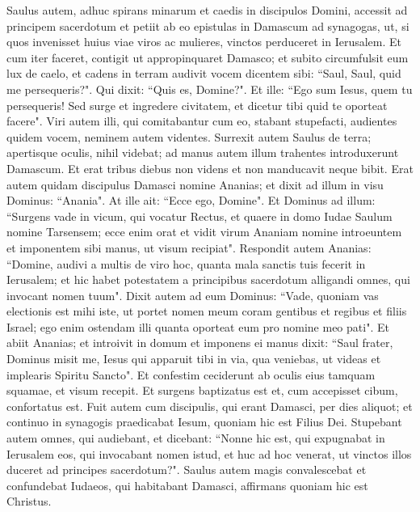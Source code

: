 \begin{biblechapter}  
\verse Saulus autem, adhuc spirans minarum et caedis in discipulos Domini, accessit ad principem sacerdotum 
\verse et petiit ab eo epistulas in Damascum ad synagogas, ut, si quos invenisset huius viae viros ac mulieres, vinctos perduceret in Ierusalem. 
\verse Et cum iter faceret, contigit ut appropinquaret Damasco; et subito circumfulsit eum lux de caelo, 
\verse et cadens in terram audivit vocem dicentem sibi: “Saul, Saul, quid me persequeris?". 
\verse Qui dixit: “Quis es, Domine?". Et ille: “Ego sum Iesus, quem tu persequeris!  
\verse Sed surge et ingredere civitatem, et dicetur tibi quid te oporteat facere".  
\verse Viri autem illi, qui comitabantur cum eo, stabant stupefacti, audientes quidem vocem, neminem autem videntes. 
\verse Surrexit autem Saulus de terra; apertisque oculis, nihil videbat; ad manus autem illum trahentes introduxerunt Damascum.  
\verse Et erat tribus diebus non videns et non manducavit neque bibit. 
\verse Erat autem quidam discipulus Damasci nomine Ananias; et dixit ad illum in visu Dominus: “Anania". At ille ait: “Ecce ego, Domine". 
\verse Et Dominus ad illum: “Surgens vade in vicum, qui vocatur Rectus, et quaere in domo Iudae Saulum nomine Tarsensem; ecce enim orat 
\verse et vidit virum Ananiam nomine introeuntem et imponentem sibi manus, ut visum recipiat". 
\verse Respondit autem Ananias: “Domine, audivi a multis de viro hoc, quanta mala sanctis tuis fecerit in Ierusalem; 
\verse et hic habet potestatem a principibus sacerdotum alligandi omnes, qui invocant nomen tuum". 
\verse Dixit autem ad eum Dominus: “Vade, quoniam vas electionis est mihi iste, ut portet nomen meum coram gentibus et regibus et filiis Israel; 
\verse ego enim ostendam illi quanta oporteat eum pro nomine meo pati". 
\verse Et abiit Ananias; et introivit in domum et imponens ei manus dixit: “Saul frater, Dominus misit me, Iesus qui apparuit tibi in via, qua veniebas, ut videas et implearis Spiritu Sancto". 
\verse Et confestim ceciderunt ab oculis eius tamquam squamae, et visum recepit. Et surgens baptizatus est 
\verse et, cum accepisset cibum, confortatus est. Fuit autem cum discipulis, qui erant Damasci, per dies aliquot; 
\verse et continuo in synagogis praedicabat Iesum, quoniam hic est Filius Dei. 
\verse Stupebant autem omnes, qui audiebant, et dicebant: “Nonne hic est, qui expugnabat in Ierusalem eos, qui invocabant nomen istud, et huc ad hoc venerat, ut vinctos illos duceret ad principes sacerdotum?". 
\verse Saulus autem magis convalescebat et confundebat Iudaeos, qui habitabant Damasci, affirmans quoniam hic est Christus. 

\end{biblechapter}

